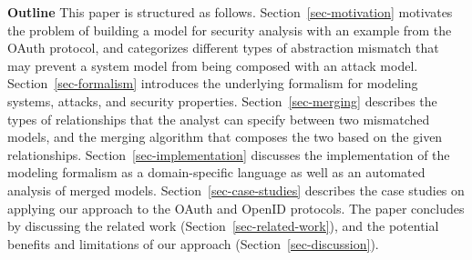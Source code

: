 \textbf{Outline} This paper is structured as
follows. Section~\ref{sec-motivation} motivates the problem of
building a model for security analysis with an example from the OAuth
protocol, and categorizes different types of abstraction mismatch that
may prevent a system model from being composed with an attack
model. Section~\ref{sec-formalism} introduces the underlying formalism
for modeling systems, attacks, and security
properties. Section~\ref{sec-merging} describes the types of
relationships that the analyst can specify between two mismatched
models, and the merging algorithm that composes the two based on the
given relationships. Section~\ref{sec-implementation} discusses the
implementation of the modeling formalism as a domain-specific language
as well as an automated analysis of merged
models. Section~\ref{sec-case-studies} describes the case studies on
applying our approach to the OAuth and OpenID protocols. The paper
concludes by discussing the related work
(Section~\ref{sec-related-work}), and the potential benefits and
limitations of our approach (Section~\ref{sec-discussion}).

